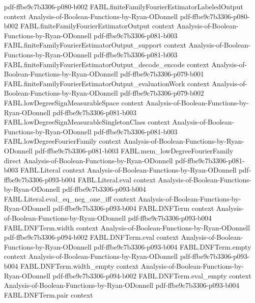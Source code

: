 \begin{theorem}
  {pdf-ffbe9c7b3306-p080-b002}
\proofstep
  {FABL.finiteFamilyFourierEstimatorLabeledOutput}
  {context}
  {Analysis-of-Boolean-Functions-by-Ryan-ODonnell}
  {pdf-ffbe9c7b3306-p080-b002}
\proofstep
  {FABL.finiteFamilyFourierEstimatorOutput}
  {context}
  {Analysis-of-Boolean-Functions-by-Ryan-ODonnell}
  {pdf-ffbe9c7b3306-p081-b003}
\proofstep
  {FABL.finiteFamilyFourierEstimatorOutput_support}
  {context}
  {Analysis-of-Boolean-Functions-by-Ryan-ODonnell}
  {pdf-ffbe9c7b3306-p081-b003}
\proofstep
  {FABL.finiteFamilyFourierEstimatorOutput_decode_encode}
  {context}
  {Analysis-of-Boolean-Functions-by-Ryan-ODonnell}
  {pdf-ffbe9c7b3306-p079-b001}
\proofstep
  {FABL.finiteFamilyFourierEstimatorOutput_evaluationWork}
  {context}
  {Analysis-of-Boolean-Functions-by-Ryan-ODonnell}
  {pdf-ffbe9c7b3306-p079-b002}
\proofstep
  {FABL.lowDegreeSignMeasurableSpace}
  {context}
  {Analysis-of-Boolean-Functions-by-Ryan-ODonnell}
  {pdf-ffbe9c7b3306-p081-b003}
\proofstep
  {FABL.lowDegreeSignMeasurableSingletonClass}
  {context}
  {Analysis-of-Boolean-Functions-by-Ryan-ODonnell}
  {pdf-ffbe9c7b3306-p081-b003}
\proofstep
  {FABL.lowDegreeFourierFamily}
  {context}
  {Analysis-of-Boolean-Functions-by-Ryan-ODonnell}
  {pdf-ffbe9c7b3306-p081-b003}
\proofstep
  {FABL.mem_lowDegreeFourierFamily}
  {direct}
  {Analysis-of-Boolean-Functions-by-Ryan-ODonnell}
  {pdf-ffbe9c7b3306-p081-b003}
\proofstep
  {FABL.Literal}
  {context}
  {Analysis-of-Boolean-Functions-by-Ryan-ODonnell}
  {pdf-ffbe9c7b3306-p093-b004}
\proofstep
  {FABL.Literal.eval}
  {context}
  {Analysis-of-Boolean-Functions-by-Ryan-ODonnell}
  {pdf-ffbe9c7b3306-p093-b004}
\proofstep
  {FABL.Literal.eval_eq_neg_one_iff}
  {context}
  {Analysis-of-Boolean-Functions-by-Ryan-ODonnell}
  {pdf-ffbe9c7b3306-p093-b004}
\proofstep
  {FABL.DNFTerm}
  {context}
  {Analysis-of-Boolean-Functions-by-Ryan-ODonnell}
  {pdf-ffbe9c7b3306-p093-b004}
\proofstep
  {FABL.DNFTerm.width}
  {context}
  {Analysis-of-Boolean-Functions-by-Ryan-ODonnell}
  {pdf-ffbe9c7b3306-p094-b002}
\proofstep
  {FABL.DNFTerm.eval}
  {context}
  {Analysis-of-Boolean-Functions-by-Ryan-ODonnell}
  {pdf-ffbe9c7b3306-p093-b004}
\proofstep
  {FABL.DNFTerm.empty}
  {context}
  {Analysis-of-Boolean-Functions-by-Ryan-ODonnell}
  {pdf-ffbe9c7b3306-p093-b004}
\proofstep
  {FABL.DNFTerm.width_empty}
  {context}
  {Analysis-of-Boolean-Functions-by-Ryan-ODonnell}
  {pdf-ffbe9c7b3306-p094-b002}
\proofstep
  {FABL.DNFTerm.eval_empty}
  {context}
  {Analysis-of-Boolean-Functions-by-Ryan-ODonnell}
  {pdf-ffbe9c7b3306-p093-b004}
\proofstep
  {FABL.DNFTerm.pair}
  {context}

\end{theorem}
